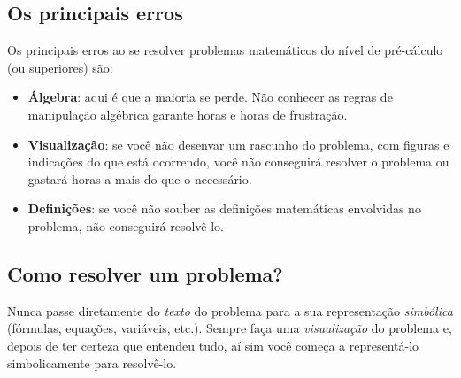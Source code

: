 \documentclass[pdftex, brazil, 12pt, twoside]{article}
\begin{document}
\subsection{Os principais erros}
\label{notas-principais-erros}

Os principais erros ao se resolver problemas matemáticos do nível de pré-cálculo
(ou superiores) são:

\begin{itemize}
\item \textbf{Álgebra}: aqui é que a maioria se perde. Não conhecer as regras de
  manipulação algébrica garante horas e horas de frustração.
\item \textbf{Visualização}: se você não desenvar um rascunho do problema, com
  figuras e indicações do que está ocorrendo, você não conseguirá resolver o problema
  ou gastará horas a mais do que o necessário.
\item \textbf{Definições}: se você não souber as definições matemáticas envolvidas
  no problema, não conseguirá resolvê-lo.
\end{itemize}

\subsection{Como resolver um problema?}
\label{notas-como-resolver}

Nunca passe diretamente do \emph{texto} do problema para a sua representação
\emph{simbólica} (fórmulas, equações, variáveis, etc.). Sempre faça uma
\emph{visualização} do problema e, depois de ter certeza que entendeu tudo,
aí sim você começa a representá-lo simbolicamente para resolvê-lo.
\end{document}
